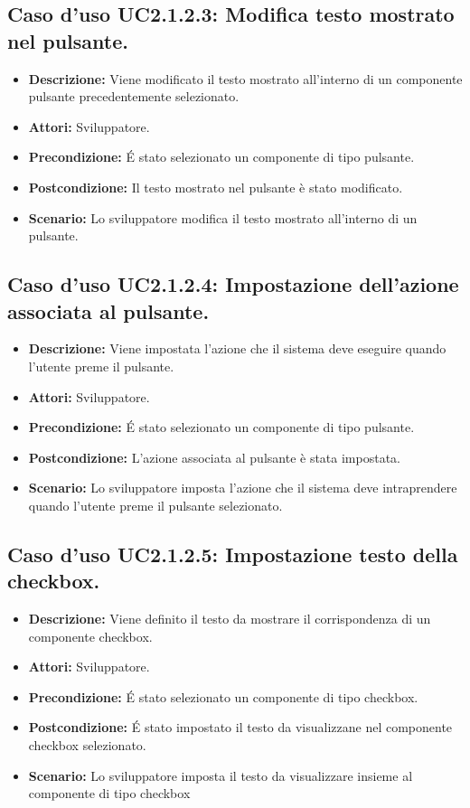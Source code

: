 \subsection{Caso d'uso UC2.1.2.3: Modifica testo mostrato nel pulsante.}
\begin{itemize}
\item[]\textbf{Descrizione:} Viene modificato il testo mostrato all'interno di un componente pulsante precedentemente selezionato.
\item[]\textbf{Attori:} Sviluppatore. 
\item[]\textbf{Precondizione:} \'E stato selezionato un componente di tipo pulsante. 
\item[]\textbf{Postcondizione:} Il testo mostrato nel pulsante è stato modificato. 
\item[]\textbf{Scenario:}
Lo sviluppatore modifica il testo mostrato all'interno di un pulsante. 
\end{itemize}

\subsection{Caso d'uso UC2.1.2.4: Impostazione dell'azione associata al pulsante.}
\begin{itemize}
\item[]\textbf{Descrizione:} Viene impostata l'azione che il sistema deve eseguire quando l'utente preme il pulsante.
\item[]\textbf{Attori:} Sviluppatore. 
\item[]\textbf{Precondizione:} \'E stato selezionato un componente di tipo pulsante. 
\item[]\textbf{Postcondizione:} L'azione associata al pulsante è stata impostata. 
\item[]\textbf{Scenario:}
Lo sviluppatore imposta l'azione che il sistema deve intraprendere quando l'utente preme il pulsante selezionato. 
\end{itemize}

\subsection{Caso d'uso UC2.1.2.5: Impostazione testo della checkbox.}
\begin{itemize}
\item[]\textbf{Descrizione:} Viene definito il testo da mostrare il corrispondenza di un componente checkbox.
\item[]\textbf{Attori:} Sviluppatore. 
\item[]\textbf{Precondizione:} \'E stato selezionato un componente di tipo checkbox. 
\item[]\textbf{Postcondizione:} \'E stato impostato il testo da visualizzane nel componente checkbox selezionato. 
\item[]\textbf{Scenario:}
 Lo sviluppatore imposta il testo da visualizzare insieme al componente di tipo checkbox 
\end{itemize}

